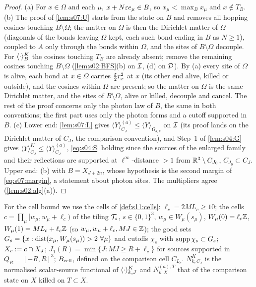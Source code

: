 \begin{proof}
(a) For $x\in\Omega$ and each $\mu$, $x+N\varepsilon e_\mu\in B$, so $x_\mu<\max_Bx_\mu$ and $x\notin T_B$. (b) The proof of \cref{lem:s07:U} starts from the state on $B$ and removes all hopping cosines touching $B\setminus\Omega$; the matter on $\Omega$ is then the Dirichlet matter of $\Omega$ (diagonals of the bonds leaving $\Omega$ kept, each such bond ending in $B$ as $N\ge1$), coupled to $A$ only through the bonds within $\Omega$, and the sites of $B\setminus\Omega$ decouple. For $\langle \cdot\rangle^K_B$ the cosines touching $T_B$ are already absent; remove the remaining cosines touching $B\setminus\Omega$ (\cref{lem:s02:BFS}(b) on $\mathcal I$, (d) on $\mathcal D$). By (a) every site of $\Omega$ is alive, each bond at $x\in\Omega$ carries $\frac{\varepsilon}2r_x^2$ at $x$ (its other end alive, killed or outside), and the cosines within $\Omega$ are present; so the matter on $\Omega$ is the same Dirichlet matter, and the sites of $B\setminus\Omega$, alive or killed, decouple and cancel. The rest of the proof concerns only the photon law of $B$, the same in both conventions; the first part uses only the photon forms and a cutoff supported in $B$. (c) Lower end: \cref{lem:s07:L} gives $\langle Y\rangle^{(a)}_{C_J}\le\langle Y\rangle_{\Omega_{J,k}}$ on $\mathcal I$ (its proof lands on the Dirichlet matter of $C_J$, the comparison convention), and Step~1 of \cref{lem:s04:G} gives $\langle Y\rangle^K_{C_J}\le\langle Y\rangle^{(a)}_{C_J}$, \eqref{eq:s04:S} holding since the sources of the enlarged family and their reflections are supported at $\ell^\infty$-distance $>1$ from $\mathbb R^3\setminus C_{J_0}$, $C_{J_0}\subset C_J$. Upper end: (b) with $B=X_{J+2n}$, whose hypothesis is the second margin of \eqref{eq:s07:margin}, a statement about photon sites. The multipliers agree (\cref{lem:s02:alg}(a)).
\end{proof}

For the cell bound we use the cells of \cref{def:s11:cells}: $\ell_c=2ML_c\ge10$; the cells $c=\prod_\mu[w_\mu,w_\mu+\ell_c)$ of the tiling $\mathcal T_s$, $s\in\{0,1\}^3$, $w_\mu\in W_\mu(s_\mu)$, $W_\mu(0)=\ell_c\mathbb Z$, $W_\mu(1)=ML_c+\ell_c\mathbb Z$ (so $w_\mu,w_\mu+\ell_c,MJ\in\mathbb Z$); the good sets $G_s=\{x:\dist(x_\mu,W_\mu(s_\mu))>2\ \forall\mu\}$ and cutoffs $\chi_s$ with $\operatorname{supp}\chi_s\subset G_s$; $X_c:=c\cap X_J$; $J_1(R)=\min\{J:MJ\ge R+\ell_c\}$ for sources supported in $Q_R=[-R,R]^3$; $B_{\rm cell}$, defined on the comparison cell $C_{L_c}$. $N^K_{k,C_J}$ is the normalised scalar-source functional of $\langle \cdot\rangle^{K}_{k,J}$ and $N^{(a),T}_{k,X}$ that of the comparison state on $X$ killed on $T\subset X$.

